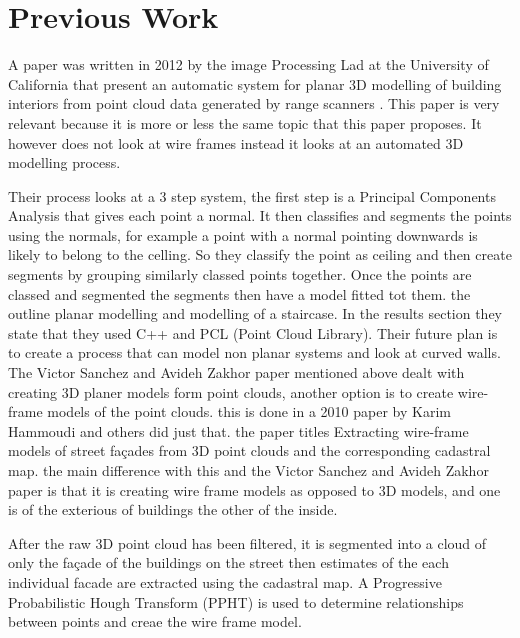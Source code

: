 

\section{Previous Work}



A paper was written in 2012 by the image Processing Lad at the University of California that present an automatic system for planar 3D modelling of building interiors from point cloud data generated by range scanners \cite{VS12}. This paper is very relevant because it is more or less the same topic that this paper proposes. It however does not look at wire frames instead it looks at an automated 3D modelling process.

Their process looks at a 3 step system, the first step is a Principal Components Analysis that gives each point a normal.
It then classifies and segments the points using the normals, for example a point with a normal pointing downwards is likely to belong to the celling. So they classify the point as ceiling and then create segments by grouping similarly classed points together.
Once the points are classed and segmented the segments then have a model fitted tot them. the outline planar modelling and modelling of a staircase. In the results section they state that they used C++ and PCL (Point Cloud Library). Their future plan is to create a process that can model non planar systems and look at curved walls.\\


The Victor Sanchez and Avideh Zakhor paper mentioned above dealt with creating 3D planer models form point clouds, another option is to create wire-frame models of the point clouds. this is done in a 2010 paper by Karim Hammoudi and others\cite{Ham12} did just that. the paper titles Extracting wire-frame models of street façades from 3D point clouds and the corresponding cadastral map. the main difference with this and the Victor Sanchez and Avideh Zakhor paper is that it is creating wire frame models as opposed to 3D models, and one is of the exterious of buildings the other of the inside.

After the raw 3D point cloud has been filtered, it is segmented into a cloud of only the façade of the buildings on the street then estimates of the each individual facade are extracted using the cadastral map. A Progressive Probabilistic Hough Transform (PPHT) is used to determine relationships between points and creae the wire frame model.



